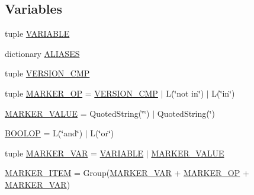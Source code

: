 \subsection*{Variables}
\begin{DoxyCompactItemize}
\item 
tuple \hyperlink{namespacesetuptools_1_1__vendor_1_1packaging_1_1markers_a021c8e62dd311d156adb2106b1225267}{V\+A\+R\+I\+A\+B\+LE}
\item 
dictionary \hyperlink{namespacesetuptools_1_1__vendor_1_1packaging_1_1markers_a3961210fadbc14d465874e34d675b741}{A\+L\+I\+A\+S\+ES}
\item 
tuple \hyperlink{namespacesetuptools_1_1__vendor_1_1packaging_1_1markers_a749acffb82482133fbe0d13f0e4c1a84}{V\+E\+R\+S\+I\+O\+N\+\_\+\+C\+MP}
\item 
tuple \hyperlink{namespacesetuptools_1_1__vendor_1_1packaging_1_1markers_ab6c386398e040ab8bc861ac909dfa032}{M\+A\+R\+K\+E\+R\+\_\+\+OP} = \hyperlink{namespacesetuptools_1_1__vendor_1_1packaging_1_1markers_a749acffb82482133fbe0d13f0e4c1a84}{V\+E\+R\+S\+I\+O\+N\+\_\+\+C\+MP} $\vert$ L(\char`\"{}not in\char`\"{}) $\vert$ L(\char`\"{}in\char`\"{})
\item 
\hyperlink{namespacesetuptools_1_1__vendor_1_1packaging_1_1markers_ac51610cd5a920fcc9e3de4654bf3fffb}{M\+A\+R\+K\+E\+R\+\_\+\+V\+A\+L\+UE} = Quoted\+String(\char`\"{}\textquotesingle{}\char`\"{}) $\vert$ Quoted\+String(\textquotesingle{}\char`\"{}\textquotesingle{})
\item 
\hyperlink{namespacesetuptools_1_1__vendor_1_1packaging_1_1markers_a491871c5d99c3bf38d4fe22bc580e76f}{B\+O\+O\+L\+OP} = L(\char`\"{}and\char`\"{}) $\vert$ L(\char`\"{}or\char`\"{})
\item 
tuple \hyperlink{namespacesetuptools_1_1__vendor_1_1packaging_1_1markers_a341d46067a2a20ccf052242f8704a616}{M\+A\+R\+K\+E\+R\+\_\+\+V\+AR} = \hyperlink{namespacesetuptools_1_1__vendor_1_1packaging_1_1markers_a021c8e62dd311d156adb2106b1225267}{V\+A\+R\+I\+A\+B\+LE} $\vert$ \hyperlink{namespacesetuptools_1_1__vendor_1_1packaging_1_1markers_ac51610cd5a920fcc9e3de4654bf3fffb}{M\+A\+R\+K\+E\+R\+\_\+\+V\+A\+L\+UE}
\item 
\hyperlink{namespacesetuptools_1_1__vendor_1_1packaging_1_1markers_a09f5a22d9147ab9be7a6fbd993a28025}{M\+A\+R\+K\+E\+R\+\_\+\+I\+T\+EM} = Group(\hyperlink{namespacesetuptools_1_1__vendor_1_1packaging_1_1markers_a341d46067a2a20ccf052242f8704a616}{M\+A\+R\+K\+E\+R\+\_\+\+V\+AR} + \hyperlink{namespacesetuptools_1_1__vendor_1_1packaging_1_1markers_ab6c386398e040ab8bc861ac909dfa032}{M\+A\+R\+K\+E\+R\+\_\+\+OP} + \hyperlink{namespacesetuptools_1_1__vendor_1_1packaging_1_1markers_a341d46067a2a20ccf052242f8704a616}{M\+A\+R\+K\+E\+R\+\_\+\+V\+AR})

\end{DoxyCompactItemize}
